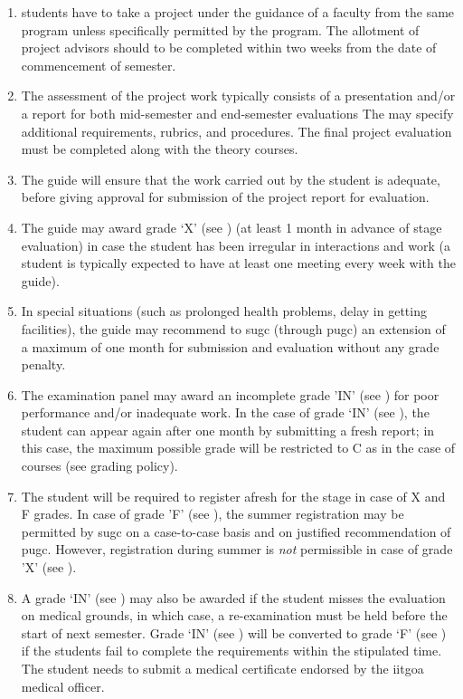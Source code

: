 \begin {enumerate}[leftmargin=15mm]
    \item \Glspl{student} have to take a project under the guidance of a \gls{faculty} from the same \gls{program} unless specifically permitted by the \gls{program}. The allotment of project advisors should to be completed within two weeks from the date of commencement of semester.
    \item The assessment of the project work typically consists of a presentation and/or a report for both mid-semester and end-semester evaluations The  may specify additional requirements, rubrics, and procedures. The final project evaluation must be completed along with the theory courses. 
    \item The guide will ensure that the work carried out by the \gls{student} is adequate, before giving approval for submission of the project report for evaluation. 
    \item The guide may award grade ‘X' (see ) (at least 1 month in advance of stage evaluation) in case the \gls{student} has been irregular in interactions and work (a \gls{student} is typically expected to have at least one meeting every week with the guide). 
    \item In special situations (such as prolonged health problems, delay in getting facilities), the guide may recommend to \acrshort{sugc} (through \acrshort{pugc}) an extension of a maximum of one month for submission and evaluation without any grade penalty. 
    \item \label{lab:clause 4.5.6} The examination panel may award an incomplete grade 'IN' (see ) for poor performance and/or inadequate work. In the case of grade ‘IN’ (see ), the \gls{student} can appear again after one month by submitting a fresh report; in this case, the maximum possible grade will be restricted to C as in the case of courses (see grading policy).
    \item The \gls{student} will be required to register afresh for the stage in case of X and F grades. In case of grade 'F' (see ), the summer registration may be permitted by \acrshort{sugc} on a case-to-case basis and on justified recommendation of \acrshort{pugc}. However, registration during summer is \textit{not} permissible in case of grade 'X' (see ). 
    \item \label{lab:clause 4.5.8} A grade ‘IN’ (see ) may also be awarded if the \gls{student} misses the evaluation on medical grounds, in which case, a re-examination must be held before the start of next semester. Grade ‘IN’ (see ) will be converted to grade ‘F’ (see ) if the \glspl{student} fail to complete the requirements within the stipulated time. The \gls{student} needs to submit a medical certificate endorsed by the \acrshort{iitgoa} medical officer.

\end{enumerate}
